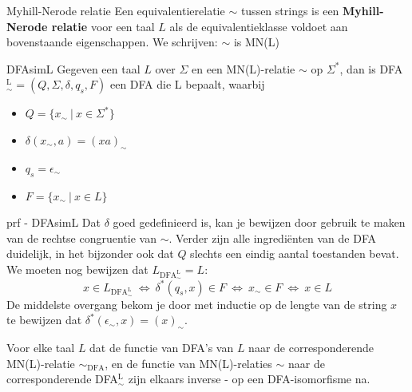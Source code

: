 \begin{theo}{Myhill-Nerode relatie}
    Een equivalentierelatie $\sim$ tussen strings is een \textbf{Myhill-Nerode relatie} voor een taal $L$ als de equivalentieklasse
    voldoet aan bovenstaande eigenschappen. We schrijven: $\sim$ is MN(L)
\end{theo}

\begin{lem}{DFAsimL}
    Gegeven een taal $L$ over $\Sigma$ en een MN(L)-relatie $\sim$ op $\Sigma^*$, dan is DFA$_{\sim}^{\text{L}} = (Q, \Sigma, \delta, q_s, F)$ een DFA die L bepaalt, waarbij
    \begin{itemize}
        \item $Q = \{x_{\sim} \ | \ x \in \Sigma^* \}$
        \item $\delta(x_{\sim},a) = (xa)_{\sim}$
        \item $q_s = \epsilon_{\sim}$
        \item $F = \{x_{\sim} \ | \ x \in L \}$
    \end{itemize}  
    \vspace{-0.3cm}
\end{lem}

\begin{prf}{prf - DFAsimL}
    Dat $\delta$ goed gedefinieerd is, kan je bewijzen door gebruik te maken van de rechtse congruentie van $\sim$.
    Verder zijn alle ingrediënten van de DFA duidelijk, in het bijzonder ook dat $Q$ slechts een eindig aantal toestanden bevat.
    We moeten nog bewijzen dat $L_{\text{DFA}_{\sim}^{\text{L}}} = L$:
    \begin{equation*}
        x \in L_{\text{DFA}_{\sim}^{\text{L}}} \ \Leftrightarrow \ \delta^*(q_s,x) \in F \ \Leftrightarrow \ x_{\sim} \in F \ \Leftrightarrow \ x \in L
    \end{equation*}
    De middelste overgang bekom je door met inductie op de lengte van de string $x$ te bewijzen dat $\delta^*(\epsilon_{\sim},x) = (x)_{\sim}$.
\end{prf}

\newpage

\begin{lem}[]{}
    Voor elke taal $L$ dat de functie van DFA's van $L$ naar de corresponderende MN(L)-relatie $\sim_{\text{DFA}}$, en de functie 
    van MN(L)-relaties $\sim$ naar de corresponderende DFA$_{\sim}^{\text{L}}$ zijn elkaars inverse - op een DFA-isomorfisme na.
\end{lem}